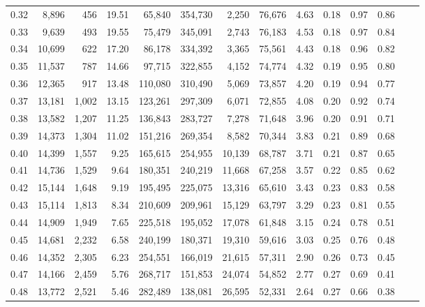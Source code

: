\begin{tabular}{rrrrrrrrrrrrrr}
0.32 &   8,896 &    456 &   19.51 &   65,840 &  354,730 &   2,250 &  76,676 &  4.63 &  0.18 &  0.97 &      0.86 \\
0.33 &   9,639 &    493 &   19.55 &   75,479 &  345,091 &   2,743 &  76,183 &  4.53 &  0.18 &  0.97 &      0.84 \\
0.34 &  10,699 &    622 &   17.20 &   86,178 &  334,392 &   3,365 &  75,561 &  4.43 &  0.18 &  0.96 &      0.82 \\
0.35 &  11,537 &    787 &   14.66 &   97,715 &  322,855 &   4,152 &  74,774 &  4.32 &  0.19 &  0.95 &      0.80 \\
0.36 &  12,365 &    917 &   13.48 &  110,080 &  310,490 &   5,069 &  73,857 &  4.20 &  0.19 &  0.94 &      0.77 \\
0.37 &  13,181 &  1,002 &   13.15 &  123,261 &  297,309 &   6,071 &  72,855 &  4.08 &  0.20 &  0.92 &      0.74 \\
0.38 &  13,582 &  1,207 &   11.25 &  136,843 &  283,727 &   7,278 &  71,648 &  3.96 &  0.20 &  0.91 &      0.71 \\
0.39 &  14,373 &  1,304 &   11.02 &  151,216 &  269,354 &   8,582 &  70,344 &  3.83 &  0.21 &  0.89 &      0.68 \\
0.40 &  14,399 &  1,557 &    9.25 &  165,615 &  254,955 &  10,139 &  68,787 &  3.71 &  0.21 &  0.87 &      0.65 \\
0.41 &  14,736 &  1,529 &    9.64 &  180,351 &  240,219 &  11,668 &  67,258 &  3.57 &  0.22 &  0.85 &      0.62 \\
0.42 &  15,144 &  1,648 &    9.19 &  195,495 &  225,075 &  13,316 &  65,610 &  3.43 &  0.23 &  0.83 &      0.58 \\
0.43 &  15,114 &  1,813 &    8.34 &  210,609 &  209,961 &  15,129 &  63,797 &  3.29 &  0.23 &  0.81 &      0.55 \\
0.44 &  14,909 &  1,949 &    7.65 &  225,518 &  195,052 &  17,078 &  61,848 &  3.15 &  0.24 &  0.78 &      0.51 \\
0.45 &  14,681 &  2,232 &    6.58 &  240,199 &  180,371 &  19,310 &  59,616 &  3.03 &  0.25 &  0.76 &      0.48 \\
0.46 &  14,352 &  2,305 &    6.23 &  254,551 &  166,019 &  21,615 &  57,311 &  2.90 &  0.26 &  0.73 &      0.45 \\
0.47 &  14,166 &  2,459 &    5.76 &  268,717 &  151,853 &  24,074 &  54,852 &  2.77 &  0.27 &  0.69 &      0.41 \\
0.48 &  13,772 &  2,521 &    5.46 &  282,489 &  138,081 &  26,595 &  52,331 &  2.64 &  0.27 &  0.66 &      0.38 \\

\end{tabular}
